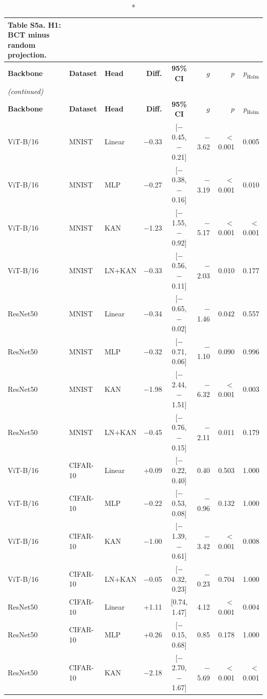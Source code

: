 \documentclass[10pt]{article}
\begin{document}
\scriptsize
\setlength{\tabcolsep}{3pt}
\begin{longtable}{lllrcrrr}
\caption*{\textbf{Table S5a.} H1: BCT minus random projection.}\\
\toprule
\textbf{Backbone} & \textbf{Dataset} & \textbf{Head} & \textbf{Diff.} & \textbf{95\% CI} & \textbf{$g$} & \textbf{$p$} & \textbf{$p_{\mathrm{Holm}}$} \\
\midrule
\endfirsthead
\multicolumn{8}{l}{\textit{(continued)}}\\
\toprule
\textbf{Backbone} & \textbf{Dataset} & \textbf{Head} & \textbf{Diff.} & \textbf{95\% CI} & \textbf{$g$} & \textbf{$p$} & \textbf{$p_{\mathrm{Holm}}$} \\
\midrule
\endhead
\bottomrule
\endfoot
ViT-B/16 & MNIST & Linear & $-$0.33 & [$-$0.45, $-$0.21] & $-$3.62 & $<$0.001 & 0.005 \\
ViT-B/16 & MNIST & MLP & $-$0.27 & [$-$0.38, $-$0.16] & $-$3.19 & $<$0.001 & 0.010 \\
ViT-B/16 & MNIST & KAN & $-$1.23 & [$-$1.55, $-$0.92] & $-$5.17 & $<$0.001 & $<$0.001 \\
ViT-B/16 & MNIST & LN+KAN & $-$0.33 & [$-$0.56, $-$0.11] & $-$2.03 & 0.010 & 0.177 \\
ResNet50 & MNIST & Linear & $-$0.34 & [$-$0.65, $-$0.02] & $-$1.46 & 0.042 & 0.557 \\
ResNet50 & MNIST & MLP & $-$0.32 & [$-$0.71, 0.06] & $-$1.10 & 0.090 & 0.996 \\
ResNet50 & MNIST & KAN & $-$1.98 & [$-$2.44, $-$1.51] & $-$6.32 & $<$0.001 & 0.003 \\
ResNet50 & MNIST & LN+KAN & $-$0.45 & [$-$0.76, $-$0.15] & $-$2.11 & 0.011 & 0.179 \\
ViT-B/16 & CIFAR-10 & Linear & +0.09 & [$-$0.22, 0.40] & 0.40 & 0.503 & 1.000 \\
ViT-B/16 & CIFAR-10 & MLP & $-$0.22 & [$-$0.53, 0.08] & $-$0.96 & 0.132 & 1.000 \\
ViT-B/16 & CIFAR-10 & KAN & $-$1.00 & [$-$1.39, $-$0.61] & $-$3.42 & $<$0.001 & 0.008 \\
ViT-B/16 & CIFAR-10 & LN+KAN & $-$0.05 & [$-$0.32, 0.23] & $-$0.23 & 0.704 & 1.000 \\
ResNet50 & CIFAR-10 & Linear & +1.11 & [0.74, 1.47] & 4.12 & $<$0.001 & 0.004 \\
ResNet50 & CIFAR-10 & MLP & +0.26 & [$-$0.15, 0.68] & 0.85 & 0.178 & 1.000 \\
ResNet50 & CIFAR-10 & KAN & $-$2.18 & [$-$2.70, $-$1.67] & $-$5.69 & $<$0.001 & $<$0.001 \\

\end{longtable}
\end{document}
